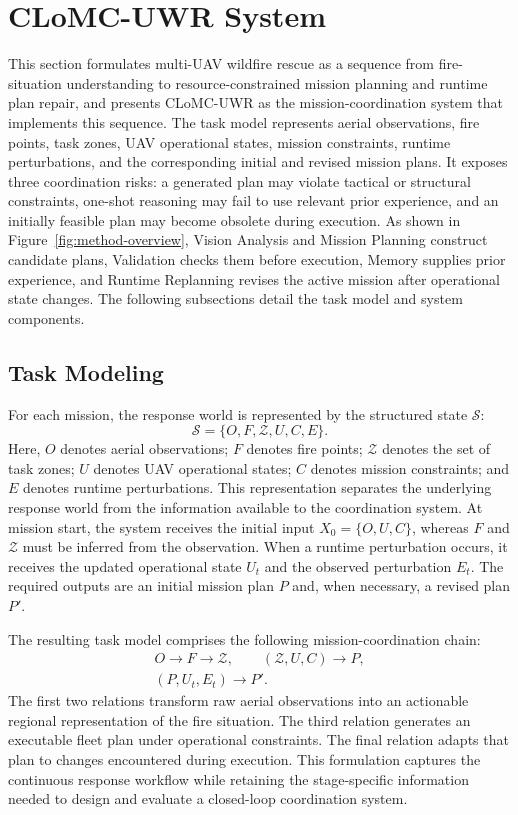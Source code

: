 \section{CLoMC-UWR System}
\label{sec:system-design}

This section formulates multi-UAV wildfire rescue as a sequence from
fire-situation understanding to resource-constrained mission planning and
runtime plan repair, and presents CLoMC-UWR as the mission-coordination system that implements this
sequence. The task model represents aerial observations,
fire points, task zones, UAV operational states, mission constraints, runtime
perturbations, and the corresponding initial and revised mission plans. It
exposes three coordination risks: a generated plan may violate tactical or structural
constraints, one-shot reasoning may fail to use relevant prior experience, and
an initially feasible plan may become obsolete during execution. As shown in
Figure~\ref{fig:method-overview}, Vision Analysis and Mission Planning construct
candidate plans, Validation checks them before execution, Memory supplies prior
experience, and Runtime Replanning revises the active mission after operational
state changes. The following subsections detail the task model and system
components.

\subsection{Task Modeling}

For each mission, the response world is represented by the structured state $\mathcal{S}$:
\[
\mathcal{S}=\{O,F,\mathcal{Z},U,C,E\}.
\]
Here, $O$ denotes aerial observations; $F$ denotes fire points; $\mathcal{Z}$
denotes the set of task zones; $U$ denotes UAV operational states; $C$ denotes mission constraints;
and $E$ denotes runtime perturbations. This representation
separates the underlying response world from the information available to the
coordination system. At mission start, the system receives the initial input
$X_0=\{O,U,C\}$, whereas $F$ and $\mathcal{Z}$ must be inferred from the observation.
When a runtime perturbation occurs, it receives the updated operational 
state $U_t$ and the observed perturbation $E_t$. The required outputs are an 
initial mission plan $P$ and, when necessary, a revised plan $P'$.

The resulting task model comprises the following mission-coordination chain:
\[
\begin{gathered}
O \rightarrow F \rightarrow \mathcal{Z},\qquad (\mathcal{Z},U,C) \rightarrow P, \\
(P,U_t,E_t) \rightarrow P'.
\end{gathered}
\]
The first two relations transform raw aerial observations into an actionable
regional representation of the fire situation. The third relation generates an
executable fleet plan under operational constraints. The final relation adapts
that plan to changes encountered during execution. This formulation captures
the continuous response workflow while retaining the stage-specific information
needed to design and evaluate a closed-loop coordination system.

